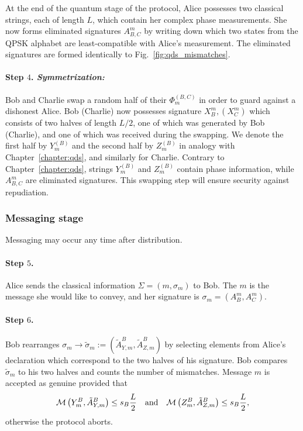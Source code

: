 At the end of the quantum stage of the protocol, Alice possesses two classical strings, each of length $L$, which contain her complex phase measurements. She now forms eliminated signatures $A_{B, C}^m$ by writing down which two states from the QPSK alphabet are least-compatible with Alice's measurement. The eliminated signatures are formed identically to Fig.~\ref{fig:qds_mismatches}.

\paragraph{Step $4$. \emph{Symmetrization:}} Bob and Charlie swap a random half of their $\Phi_m^{\left(B, C\right)}$ in order to guard against a dishonest Alice. Bob (Charlie) now possesses signature $X_B^m, \left(X_C^m\right)$ which consists of two halves of length $L/2$, one of which was generated by Bob (Charlie), and one of which was received during the swapping. We denote the first half by $Y_m^{\left(B\right)}$ and the second half by $Z_m^{\left(B\right)}$ in analogy with Chapter~\ref{chapter:qds}, and similarly for Charlie. Contrary to Chapter~\ref{chapter:qds}, strings $Y_m^{\left(B\right)}$ and $Z_m^{\left(B\right)}$ contain phase information, while $A_{B, C}^m$ are eliminated signatures. This swapping step will ensure security against repudiation.

\subsubsection{Messaging stage}
Messaging may occur any time after distribution.

\paragraph{Step $5$.} Alice sends the classical information $\Sigma = \left(m, \sigma_m\right)$ to Bob. The $m$ is the message she would like to convey, and her signature is $\sigma_m = \left(A_B^m, A_C^m\right)$. 

\paragraph{Step $6$.} Bob rearranges $\sigma_m \rightarrow \tilde{\sigma}_m := \left(\tilde{A}_{Y, m}^B, \tilde{A}_{Z, m}^B\right)$ by selecting elements from Alice's declaration which correspond to the two halves of his signature. Bob compares $\tilde{\sigma}_m$ to his two halves and counts the number of mismatches. Message $m$ is accepted as genuine provided that
\begin{equation}
\mathcal{M}\left(Y_m^B, \tilde{A}_{Y, m}^B\right) \le s_B \frac{L}{2} \qq{and} \mathcal{M}\left(Z_m^B, \tilde{A}_{Z, m}^B\right) \le s_B \frac{L}{2},
\end{equation}
otherwise the protocol aborts. %

